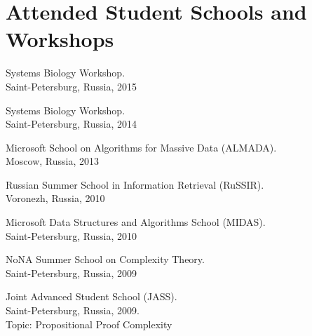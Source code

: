 \section{Attended Student Schools and Workshops}
%
\begin{innerlist}

\item Systems Biology Workshop. \\
Saint-Petersburg, Russia, 2015

\item Systems Biology Workshop. \\
Saint-Petersburg, Russia, 2014

\item Microsoft School on Algorithms for Massive Data (ALMADA). \\
Moscow, Russia, 2013

% 
% 

\item Russian Summer School in Information Retrieval (RuSSIR).\\ 
Voronezh, Russia, 2010

\item Microsoft Data Structures and Algorithms School (MIDAS).\\ 
Saint-Petersburg, Russia, 2010

\item NoNA Summer School on Complexity Theory.\\
Saint-Petersburg, Russia, 2009

\item Joint Advanced Student School (JASS).\\
Saint-Petersburg, Russia, 2009.\\ 
Topic: Propositional Proof Complexity

\end{innerlist}

